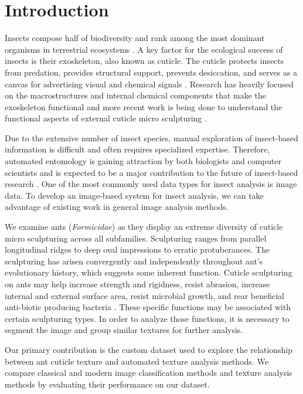 \documentclass{aci}
\numberwithin{equation}{section}
\begin{document}
\section{Introduction}

Insects compose half of biodiversity and rank among the most dominant organisms
in terrestrial ecosystems \cite{sheikh_diverse_2017}. A key factor for the
ecological success of insects is their exoskeleton, also known as cuticle. The
cuticle protects insects from predation, provides structural support, prevents
desiccation, and serves as a canvas for advertising visual and chemical signals
\cite{gullan_insects_2009}. Research has heavily focused on the macrostructures
and internal chemical components that make the exoskeleton functional and more
recent work is being done to understand the functional aspects of external
cuticle micro sculpturing \cite{muthukrishnan_insect_2020,
    gunderson_insect_1989, watson_diversity_2017}.

Due to the extensive number of insect species, manual exploration of
insect-based information is difficult and often requires specialized expertise.
Therefore, automated entomology is gaining attraction by both biologists and
computer scientists and is expected to be a major contribution to the future of
insect-based research \cite{martineau_survey_2017}. One of the most commonly
used data types for insect analysis is image data. To develop an image-based
system for insect analysis, we can take advantage of existing work in general
image analysis methods.

We examine ants (\textit{Formicidae}) as they display an extreme diversity of
cuticle micro sculpturing across all subfamilies. Sculpturing ranges from
parallel longitudinal ridges to deep oval impressions to erratic protuberances.
The sculpturing has arisen convergently and independently throughout ant's
evolutionary history, which suggests some inherent function. Cuticle sculpturing
on ants may help increase strength and rigidness, resist abrasion, increase
internal and external surface area, resist microbial growth, and rear beneficial
anti-biotic producing bacteria \cite{johnson_effect_2011,
    bruckner_relationship_2017, currie_coevolved_2006}. These specific functions may
be associated with certain sculpturing types. In order to analyze those
functions, it is necessary to segment the image and group similar textures for
further analysis.

Our primary contribution is the custom dataset used to explore the relationship
between ant cuticle texture and automated texture analysis methods. We compare
classical and modern image classification methods and texture analysis methods
by evaluating their performance on our dataset.
\end{document}
